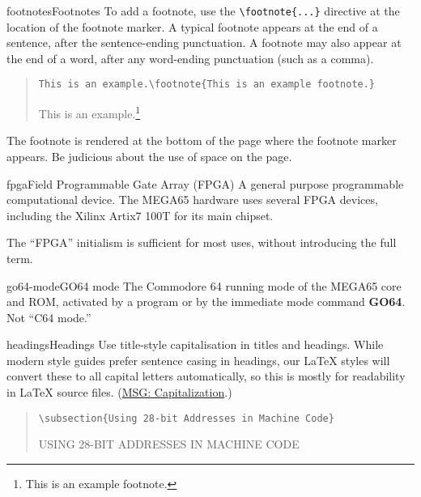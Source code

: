 \begin{sgentry}{footnotes}{Footnotes}
    To add a footnote, use the \texttt{{\textbackslash}footnote\{...\}} directive at the location of the footnote marker. A typical footnote appears at the end of a sentence, after the sentence-ending punctuation. A footnote may also appear at the end of a word, after any word-ending punctuation (such as a comma).

    \begin{quote}
        \texttt{This is an example.{\textbackslash}footnote\{This is an example footnote.\}}

        \hrulefill

        This is an example.\footnote{This is an example footnote.}
    \end{quote}

    The footnote is rendered at the bottom of the page where the footnote marker appears. Be judicious about the use of space on the page.
\end{sgentry}

\begin{sgentry}{fpga}{Field Programmable Gate Array (FPGA)}
    A general purpose programmable computational device. The MEGA65 hardware uses several FPGA devices, including the Xilinx Artix7 100T for its main chipset.

    The ``FPGA'' initialism is sufficient for most uses, without introducing the full term.
\end{sgentry}

\begin{sgentry}{go64-mode}{GO64 mode}
    The Commodore 64 running mode of the MEGA65 core and ROM, activated by a program or by the immediate mode command \textbf{GO64}. Not ``C64 mode.''
\end{sgentry}

\begin{sgentry}{headings}{Headings}
    Use title-style capitalisation in titles and headings. While modern style guides prefer sentence casing in headings, our LaTeX styles will convert these to all capital letters automatically, so this is mostly for readability in LaTeX source files. (\href{https://learn.microsoft.com/en-us/style-guide/capitalization}{MSG: Capitalization}.)

    \begin{quote}
        \texttt{{\textbackslash}subsection\{Using 28-bit Addresses in Machine Code\}}

        \hrulefill

        {\large USING 28-BIT ADDRESSES IN MACHINE CODE}
    \end{quote}
\end{sgentry}

